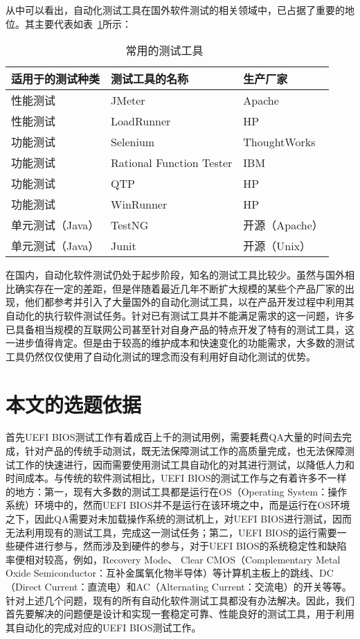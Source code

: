   从中可以看出，自动化测试工具在国外软件测试的相关领域中，已占据了重要的地位。其主要代表如表~\ref{tab:常用的测试工具}所示：
  
  	\begin{table}[H]
		\centering
		\caption{常用的测试工具~\cite{27}}
		\label{tab:常用的测试工具}
		\begin{center}
		\begin{tabular}{|l|l|l|} 
		\hline
		适用于的测试种类 & 测试工具的名称 & 生产厂家 \\ \hline
		性能测试 & JMeter & Apache \\ \hline
		性能测试 & LoadRunner & HP \\ \hline
		功能测试 & Selenium & ThoughtWorks \\ \hline
		功能测试 & Rational Function Tester & IBM \\ \hline
		功能测试 & QTP & HP \\ \hline
		功能测试 & WinRunner & HP \\ \hline
		单元测试（Java） & TestNG & 开源（Apache） \\ \hline
		单元测试（Java） & Junit & 开源（Unix） \\ \hline
		\end{tabular}
		\end{center}
	\end{table}
  
  在国内，自动化软件测试仍处于起步阶段，知名的测试工具比较少。虽然与国外相比确实存在一定的差距，但是伴随着最近几年不断扩大规模的某些个产品厂家的出现，他们都参考并引入了大量国外的自动化测试工具，以在产品开发过程中利用其自动化的执行软件测试任务。针对已有测试工具并不能满足需求的这一问题，许多已具备相当规模的互联网公司甚至针对自身产品的特点开发了特有的测试工具，这一进步值得肯定。但是由于较高的维护成本和快速变化的功能需求，大多数的测试工具仍然仅仅使用了自动化测试的理念而没有利用好自动化测试的优势。
  
\section{本文的选题依据}

  首先UEFI BIOS测试工作有着成百上千的测试用例，需要耗费QA大量的时间去完成，针对产品的传统手动测试，既无法保障测试工作的高质量完成，也无法保障测试工作的快速进行，因而需要使用测试工具自动化的对其进行测试，以降低人力和时间成本。与传统的软件测试相比，UEFI BIOS的测试工作与之有着许多不一样的地方：第一，现有大多数的测试工具都是运行在OS（Operating System：操作系统）环境中的，然而UEFI BIOS并不是运行在该环境之中，而是运行在OS环境之下，因此QA需要对未加载操作系统的测试机上，对UEFI BIOS进行测试，因而无法利用现有的测试工具，完成这一测试任务；第二，UEFI BIOS的运行需要一些硬件进行参与，然而涉及到硬件的参与，对于UEFI BIOS的系统稳定性和缺陷率便相对较高，例如，Recovery Mode、 Clear CMOS（Complementary Metal Oxide Semiconductor：互补金属氧化物半导体）等计算机主板上的跳线、DC（Direct Current：直流电）和AC（Alternating Current：交流电）的开关等等。针对上述几个问题，现有的所有自动化软件测试工具都没有办法解决。因此，我们首先要解决的问题便是设计和实现一套稳定可靠、性能良好的测试工具，用于利用其自动化的完成对应的UEFI BIOS测试工作。
  
